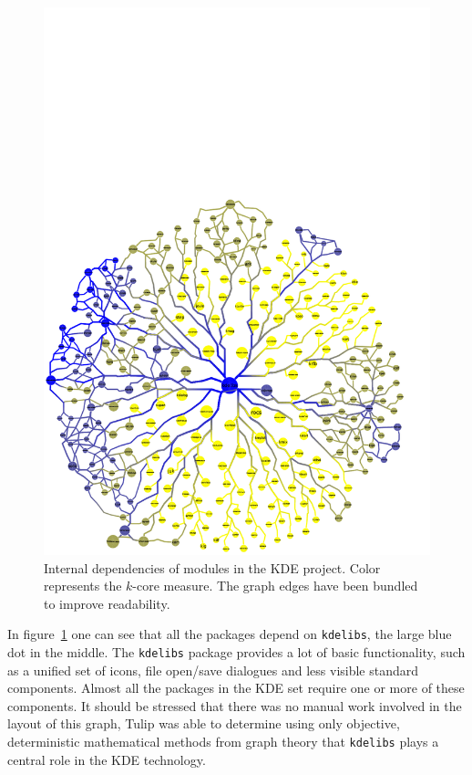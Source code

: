 \documentclass[smallextended,final]{svjour3}
\begin{document}
\begin{figure}
\centering
\includegraphics[clip,trim=0 0 1cm 10cm,width=\linewidth]{kde.pdf}
\caption{Internal dependencies of modules in the KDE project. Color represents the $k$-core measure. The graph edges have been bundled to improve readability.}\label{fig:kde2}
\end{figure}

In figure~\ref{fig:kde2} one can see that all the packages depend on \verb|kdelibs|, the large blue dot in the middle. The \verb|kdelibs| package provides a lot of basic functionality, such as a unified set of icons, file open/save dialogues and less visible standard components. Almost all the packages in the KDE set require one or more of these components. It should be stressed that there was no manual work involved in the layout of this graph, Tulip was able to determine using only objective, deterministic mathematical methods from graph theory that \verb|kdelibs| plays a central role in the KDE technology.
\end{document}
